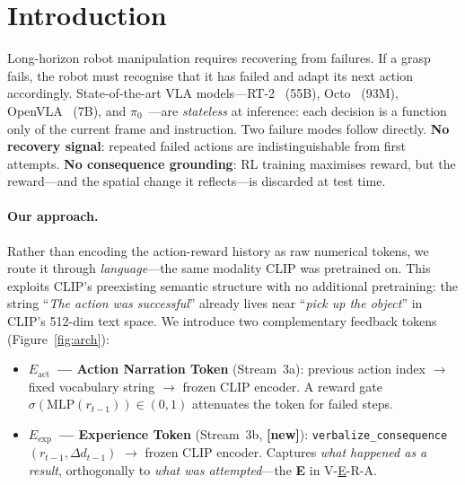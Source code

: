\documentclass{article}
\newcommand{\Lact}{$E_{\mathrm{act}}$\xspace}
\newcommand{\Lexp}{$E_{\mathrm{exp}}$\xspace}
\newcommand{\NEW}{\textcolor{NewOrange}{\textbf{[new]}}\xspace}
\begin{document}
\section{Introduction}
\label{sec:intro}

Long-horizon robot manipulation requires recovering from failures.
If a grasp fails, the robot must recognise that it has failed and adapt
its next action accordingly.
State-of-the-art VLA models---RT-2~\citep{brohan2023rt2} (55B),
Octo~\citep{octo2024} (93M), OpenVLA~\citep{kim2024openvla} (7B),
and $\pi_0$~\citep{black2024pi0}---are \emph{stateless} at inference:
each decision is a function only of the current frame and instruction.
Two failure modes follow directly.
\textbf{No recovery signal}: repeated failed actions are
indistinguishable from first attempts.
\textbf{No consequence grounding}: RL training maximises reward, but the
reward---and the spatial change it reflects---is discarded at test time.

\paragraph{Our approach.}
Rather than encoding the action-reward history as raw numerical tokens, we
route it through \emph{language}---the same modality CLIP was pretrained
on.
This exploits CLIP's preexisting semantic structure with no additional
pretraining: the string ``\emph{The action was successful}'' already
lives near ``\emph{pick up the object}'' in CLIP's 512-dim text space.
We introduce two complementary feedback tokens (Figure~\ref{fig:arch}):

\begin{itemize}[leftmargin=1.5em,itemsep=2pt]
\item \textbf{\Lact\ — Action Narration Token} (Stream~3a): previous action
  index $\to$ fixed vocabulary string $\to$ frozen CLIP encoder.
  A reward gate $\sigma(\mathrm{MLP}(r_{t-1}))\!\in\!(0,1)$ attenuates
  the token for failed steps.
\item \textbf{\Lexp\ — Experience Token} (Stream~3b, \NEW):
  \texttt{verbalize\_consequence}$(r_{t-1}, \Delta d_{t-1})$ $\to$
  frozen CLIP encoder. Captures \emph{what happened as a result},
  orthogonally to \emph{what was attempted}---the \textbf{E} in
  V-\underline{E}-R-A.
\end{itemize}
\end{document}
